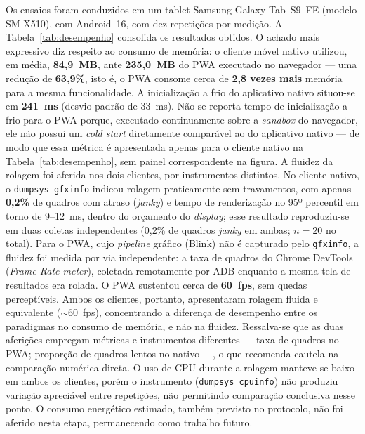 \documentclass[12pt]{article}
\begin{document}
Os ensaios foram conduzidos em um tablet Samsung Galaxy Tab~S9~FE
(modelo SM-X510), com Android~16, com dez repetições por medição.
A Tabela~\ref{tab:desempenho} consolida os resultados obtidos. O achado mais
expressivo diz respeito ao consumo de memória: o cliente móvel nativo utilizou,
em média, \textbf{84,9~MB}, ante \textbf{235,0~MB} do PWA executado no
navegador --- uma redução de \textbf{63,9\%}, isto é, o PWA consome cerca de
\textbf{2,8 vezes mais} memória para a mesma funcionalidade. A inicialização a
frio do aplicativo nativo situou-se em \textbf{241~ms} (desvio-padrão de
33~ms). Não se reporta tempo de inicialização a frio para o PWA porque, executado
continuamente sobre a \emph{sandbox} do navegador, ele não possui um \emph{cold
start} diretamente comparável ao do aplicativo nativo --- de modo que essa métrica
é apresentada apenas para o cliente nativo na Tabela~\ref{tab:desempenho}, sem painel
correspondente na figura. A fluidez da rolagem foi aferida nos dois clientes, por
instrumentos distintos. No cliente nativo, o \texttt{dumpsys gfxinfo} indicou rolagem
praticamente sem travamentos, com apenas \textbf{0,2\%} de quadros com atraso
(\emph{janky}) e tempo de renderização no 95º percentil em torno de 9--12~ms, dentro
do orçamento do \emph{display}; esse resultado reproduziu-se em duas coletas
independentes (0,2\% de quadros \emph{janky} em ambas; $n=20$ no total). Para o PWA,
cujo \emph{pipeline} gráfico (Blink) não é capturado pelo \texttt{gfxinfo}, a fluidez
foi medida por via independente: a taxa de quadros do Chrome DevTools (\emph{Frame
Rate meter}), coletada remotamente por ADB enquanto a mesma tela de resultados era
rolada. O PWA sustentou cerca de \textbf{60~fps}, sem quedas perceptíveis. Ambos os
clientes, portanto, apresentaram rolagem fluida e equivalente ($\sim$60~fps),
concentrando a diferença de desempenho entre os paradigmas no consumo de memória, e
não na fluidez. Ressalva-se que as duas aferições empregam métricas e instrumentos
diferentes --- taxa de quadros no PWA; proporção de quadros lentos no nativo ---, o
que recomenda cautela na comparação numérica direta. O uso de CPU durante a
rolagem manteve-se baixo em ambos os clientes, porém o instrumento
(\texttt{dumpsys cpuinfo}) não produziu variação apreciável entre repetições, não
permitindo comparação conclusiva nesse ponto. O consumo energético estimado,
também previsto no protocolo, não foi aferido nesta etapa, permanecendo como
trabalho futuro.
\end{document}
